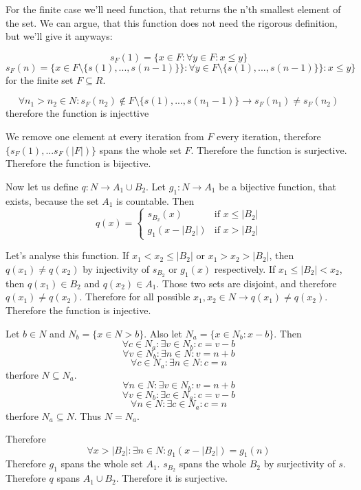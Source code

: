 \documentclass[11pt,oneside,titlepage]{article}
\begin{document}
For the finite case we'll need function, that returns the n'th smallest
element of the set. We can argue, that this function does not need the
rigorous definition, but we'll give it anyways:

$$s_F(1) = \{x \in F: \forall y \in F: x \leq y\}$$
$$s_F(n) = \{x \in F \setminus \{s(1),...,s(n - 1)\}\}: \forall y \in F \setminus \{s(1),...,s(n - 1)\}\}: x \leq y\}$$
for the finite set $F \subseteq R$.

$$\forall n_1 > n_2 \in N: s_F(n_2) \notin F \setminus \{s(1),...,s(n_1 - 1)\}
\to s_F(n_1) \neq s_F(n_2)$$
therefore the function is injecttive

We remove one element at every iteration from $F$ every iteration, therefore
$\{s_F(1),...s_F(|F|)\}$ spans the whole set $F$. Therefore the function is
surjective. Therefore the function is bijective.

Now let us define $q: N \to A_1 \cup B_2$. Let $g_1: N \to A_1$ be a bijective
function, that exists, because the set $A_1$ is countable. Then 
\begin{equation}
  q(x)=
  \begin{cases}
    s_{B_2}(x) & \text{if } x \leq |B_2|\\
    g_1(x - |B_2|) & \text{if } x > |B_2|
  \end{cases}
\end{equation}

Let's analyse this function. If $x_1 < x_2 \leq |B_2|$ or $x_1 > x_2 > |B_2|$,
then $q(x_1) \neq q(x_2)$ by injectivity of $s_{B_2}$ or $g_1(x)$ respectively.
If $x_1 \leq |B_2| < x_2$, then $q(x_1) \in B_2$ and $q(x_2) \in A_1$. Those
two sets are disjoint, and therefore $q(x_1) \neq q(x_2)$. Therefore for
all possible $x_1,x_2 \in N \to q(x_1) \neq q(x_2)$. Therefore the function
is injective.

Let $b \in N$ and  $N_b = \{x \in N > b\}$. Also let  $N_a = \{x \in N_b: x -
b\}$. Then
$$\forall c \in N_a: \exists v \in N_b: c = v - b$$
$$\forall v \in N_b: \exists n \in N: v = n + b$$
$$\forall c \in N_a: \exists n \in N: c = n$$
therfore $N \subseteq N_a$.
$$\forall n \in N: \exists v \in N_b: v = n + b$$
$$\forall v \in N_b: \exists c \in N_a: c = v - b$$
$$\forall n \in N: \exists c \in N_a: c = n$$
therfore $N_a \subseteq N$. Thus $N = N_a$.

Therefore
$$\forall x > |B_2|: \exists n \in N: g_1(x - |B_2|) = g_1(n)$$
Therefore $g_1$ spans the whole set $A_1$. $s_{B_2}$ spans the whole $B_2$ by
surjectivity of $s$. Therefore $q$ spans $A_1 \cup B_2$. Therefore it
is surjective.
\end{document}
